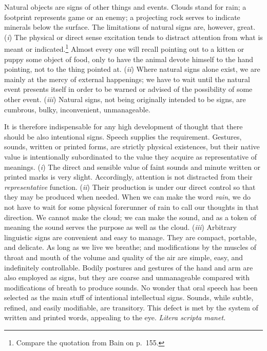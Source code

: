 \documentclass[showtrims,ustradepaper]{memoir}
\begin{document}

Natural objects are signs of other things and events. Clouds stand for
rain; a footprint represents game or an enemy; a projecting rock serves
to indicate minerals below the surface. The limitations of natural signs
are, however, great. (\emph{i}) The physical or direct sense excitation
tends to distract attention from what is meant or
indicated.\footnote{ Compare the quotation from Bain on p.\ 155. }
Almost every one will recall pointing out to a kitten or puppy some
object of food, only to have the animal devote himself to the hand
pointing, not to the thing pointed at. (\emph{ii}) Where natural signs
alone exist, we are mainly at the mercy of external happenings;
we
have to wait until the natural event presents itself in order to be
warned or advised of the possibility of some other event. (\emph{iii})
Natural signs, not being originally intended to be signs, are cumbrous,
bulky, inconvenient, unmanageable.


It is therefore indispensable for any high development of thought that
there should be also intentional signs. Speech supplies the requirement.
Gestures, sounds, written or printed forms, are strictly physical
existences, but their native value is intentionally subordinated to the
value they acquire as representative of meanings. (\emph{i}) The direct
and sensible value of faint sounds and minute written or printed marks
is very slight. Accordingly, attention is not distracted from their
\emph{representative} function. (\emph{ii}) Their production is under
our direct control so that they may be produced when needed. When we can
make the word \emph{rain}, we do not have to wait for some physical
forerunner of rain to call our thoughts in that direction. We cannot
make the cloud; we can make the sound, and as a token of meaning the
sound serves the purpose as well as the cloud. (\emph{iii}) Arbitrary
linguistic signs are convenient and easy to manage. They are compact,
portable, and delicate. As long as we live we breathe; and modifications
by the muscles of throat and mouth of the volume and quality of the air
are simple, easy, and indefinitely controllable. Bodily postures and
gestures of the hand and arm are also employed as signs, but they are
coarse and unmanageable compared with modifications of breath to produce
sounds. No wonder that oral speech has been selected as the main stuff
of intentional intellectual signs. Sounds, while subtle, refined, and
easily modifiable, are transitory. This defect is met by the system of
written
and printed words, appealing to the eye. \emph{Litera scripta manet.}
\end{document}
